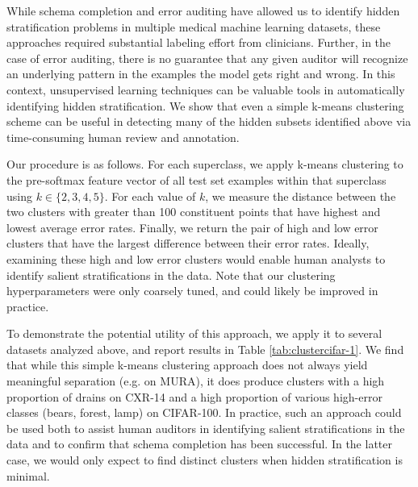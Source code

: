 \documentclass{article}
\begin{document}
While schema completion and error auditing have allowed us to identify hidden stratification problems in multiple medical machine learning datasets, these approaches required substantial labeling effort from clinicians.
Further, in the case of error auditing, there is no guarantee that any given auditor will recognize an underlying pattern in the examples the model gets right and wrong.
In this context, unsupervised learning techniques can be valuable tools in automatically identifying hidden stratification.
We show that even a simple k-means clustering scheme can be useful in detecting many of the hidden subsets identified above via time-consuming human review and annotation.

Our procedure is as follows.  
For each superclass, we apply k-means clustering to the pre-softmax feature vector of all test set examples within that superclass using $k \in \{2,3,4,5\}$.
For each value of $k$, we measure the distance between the two clusters with greater than 100 constituent points that have highest and lowest average error rates.
Finally, we return the pair of high and low error clusters that have the largest difference between their error rates.
Ideally, examining these high and low error clusters would enable human analysts to identify salient stratifications in the data.
Note that our clustering hyperparameters were only coarsely tuned, and could likely be improved in practice.

To demonstrate the potential utility of this approach, we apply it to several datasets analyzed above, and report results in Table \ref{tab:clustercifar-1}.  
We find that while this simple k-means clustering approach does not always yield meaningful separation (e.g. on MURA), it does produce clusters with a high proportion of drains on CXR-14 and a high proportion of various high-error classes (bears, forest, lamp) on CIFAR-100.  
 In practice, such an approach could be used both to assist human auditors in identifying salient stratifications in the data and to confirm that schema completion has been successful.
 In the latter case, we would only expect to find distinct clusters when hidden stratification is minimal.
\end{document}
